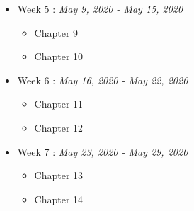 \documentclass[11pt]{article}
\theoremstyle{definition}
\theoremstyle{remark}
\begin{document}
\begin{itemize}
	\item Week 5 : \textit{May 9, 2020 - May 15, 2020}
	\begin{itemize}
		\itemsep-1mm
		\item Chapter 9
		\item Chapter 10
	\end{itemize}
\end{itemize}

\begin{itemize}
	\item Week 6 : \textit{May 16, 2020 - May 22, 2020}
	\begin{itemize}
		\itemsep-1mm
		\item Chapter 11
		\item Chapter 12
	\end{itemize}
\end{itemize}

\begin{itemize}
	\item Week 7 : \textit{May 23, 2020 - May 29, 2020}
	\begin{itemize}
		\itemsep-1mm
		\item Chapter 13
		\item Chapter 14
	\end{itemize}
\end{itemize}

\medskip
{}


\end{document}
